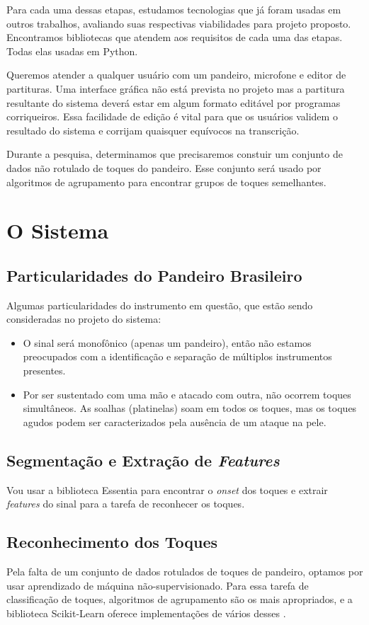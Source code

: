 \documentclass[
  dissertacao,
  brazil
]{ThesisPUC}
\begin{document}
Para cada uma dessas etapas, estudamos tecnologias que já foram usadas em outros trabalhos, avaliando suas respectivas viabilidades para projeto proposto. Encontramos bibliotecas que atendem aos requisitos de cada uma das etapas. Todas elas usadas em Python. 

Queremos atender a qualquer usuário com um pandeiro, microfone e editor de partituras. Uma interface gráfica não está prevista no projeto mas a partitura resultante do sistema deverá estar em algum formato editável por programas corriqueiros. Essa facilidade de edição é vital para que os usuários validem o resultado do sistema e corrijam quaisquer equívocos na transcrição.

Durante a pesquisa, determinamos que precisaremos constuir um conjunto de dados não rotulado de toques do pandeiro. Esse conjunto será usado por algoritmos de agrupamento para encontrar grupos de toques semelhantes.

\section{O Sistema}
\subsection{Particularidades do Pandeiro Brasileiro}
Algumas particularidades do instrumento em questão, que estão sendo consideradas no projeto do sistema: 
\begin{itemize}
    \item O sinal será monofônico (apenas um pandeiro), então não estamos preocupados com a identificação e separação de múltiplos instrumentos presentes.
    \item Por ser sustentado com uma mão e atacado com outra, não ocorrem toques simultâneos. As soalhas (platinelas) soam em todos os toques, mas os toques agudos podem ser caracterizados pela ausência de um ataque na pele.
\end{itemize}

\subsection{Segmentação e Extração de \emph{Features}}
Vou usar a biblioteca Essentia para encontrar o \emph{onset} dos toques e extrair \emph{features} do sinal para a tarefa de reconhecer os toques.

\subsection{Reconhecimento dos Toques}
Pela falta de um conjunto de dados rotulados de toques de pandeiro, optamos por usar aprendizado de máquina não-supervisionado. Para essa tarefa de classificação de toques, algoritmos de agrupamento são os mais apropriados, e a biblioteca Scikit-Learn oferece implementações de vários desses \cite{scikit2019Clustering}.
\end{document}
